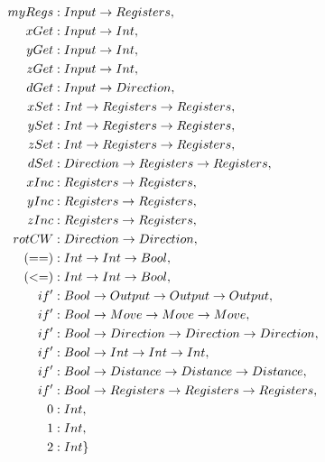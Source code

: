 \documentclass[12pt,a4paper]{report}
\begin{document}
\begin{align*}
myRegs           &: Input \rightarrow Registers                             ,\\         
xGet             &: Input \rightarrow Int                                   ,\\     
yGet             &: Input \rightarrow Int                                   ,\\     
zGet             &: Input \rightarrow Int                                   ,\\     
dGet             &: Input \rightarrow Direction                             ,\\          
xSet             &: Int \rightarrow Registers \rightarrow Registers                 ,\\          
ySet             &: Int \rightarrow Registers \rightarrow Registers                 ,\\          
zSet             &: Int \rightarrow Registers \rightarrow Registers                 ,\\          
dSet             &: Direction \rightarrow Registers \rightarrow Registers           ,\\                
xInc             &: Registers \rightarrow Registers                         ,\\              
yInc             &: Registers \rightarrow Registers                         ,\\              
zInc             &: Registers \rightarrow Registers                         ,\\              
rotCW            &: Direction \rightarrow Direction                         ,\\                                                             
(==)             &: Int \rightarrow Int \rightarrow Bool                            ,\\                                      
(<=)             &: Int \rightarrow Int \rightarrow Bool                            ,\\               
if'              &: Bool \rightarrow Output \rightarrow Output \rightarrow Output           ,\\                                  
if'              &: Bool \rightarrow Move \rightarrow Move \rightarrow Move                 ,\\                                  
if'              &: Bool \rightarrow Direction \rightarrow Direction \rightarrow Direction  ,\\              
if'              &: Bool \rightarrow Int \rightarrow Int \rightarrow Int                    ,\\     
if'              &: Bool \rightarrow Distance \rightarrow Distance \rightarrow Distance     ,\\        
if'              &: Bool \rightarrow Registers \rightarrow Registers \rightarrow Registers  ,\\                           
0                &: Int                                             ,\\                                     
1                &: Int                                             ,\\                                    
2                &: Int                                             \}\\
\end{align*}
\end{document}
